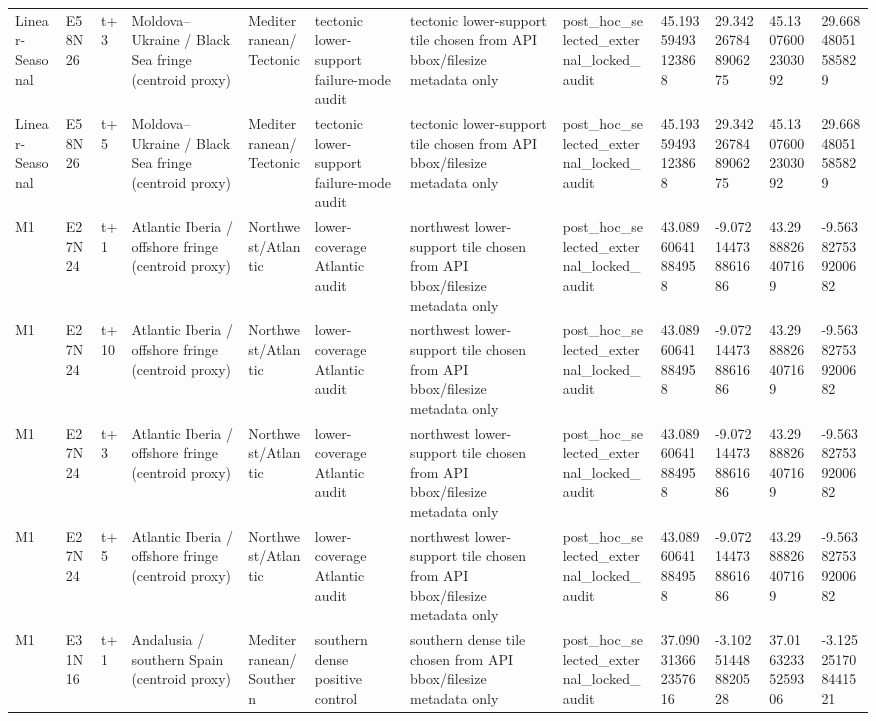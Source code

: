 \begin{landscape}
\begin{longtable}{llllllllllll}
Linear-Seasonal & E58N26 & t+3 & Moldova–Ukraine / Black Sea fringe (centroid proxy) & Mediterranean/Tectonic & tectonic lower-support failure-mode audit & tectonic lower-support tile chosen from API bbox/filesize metadata only & post\_hoc\_selected\_external\_locked\_audit & 45.19359493123868 & 29.342267848906275 & 45.13076002303092 & 29.66848051585829 \\
Linear-Seasonal & E58N26 & t+5 & Moldova–Ukraine / Black Sea fringe (centroid proxy) & Mediterranean/Tectonic & tectonic lower-support failure-mode audit & tectonic lower-support tile chosen from API bbox/filesize metadata only & post\_hoc\_selected\_external\_locked\_audit & 45.19359493123868 & 29.342267848906275 & 45.13076002303092 & 29.66848051585829 \\
M1 & E27N24 & t+1 & Atlantic Iberia / offshore fringe (centroid proxy) & Northwest/Atlantic & lower-coverage Atlantic audit & northwest lower-support tile chosen from API bbox/filesize metadata only & post\_hoc\_selected\_external\_locked\_audit & 43.08960641884958 & -9.072144738861686 & 43.2988826407169 & -9.563827539200682 \\
M1 & E27N24 & t+10 & Atlantic Iberia / offshore fringe (centroid proxy) & Northwest/Atlantic & lower-coverage Atlantic audit & northwest lower-support tile chosen from API bbox/filesize metadata only & post\_hoc\_selected\_external\_locked\_audit & 43.08960641884958 & -9.072144738861686 & 43.2988826407169 & -9.563827539200682 \\
M1 & E27N24 & t+3 & Atlantic Iberia / offshore fringe (centroid proxy) & Northwest/Atlantic & lower-coverage Atlantic audit & northwest lower-support tile chosen from API bbox/filesize metadata only & post\_hoc\_selected\_external\_locked\_audit & 43.08960641884958 & -9.072144738861686 & 43.2988826407169 & -9.563827539200682 \\
M1 & E27N24 & t+5 & Atlantic Iberia / offshore fringe (centroid proxy) & Northwest/Atlantic & lower-coverage Atlantic audit & northwest lower-support tile chosen from API bbox/filesize metadata only & post\_hoc\_selected\_external\_locked\_audit & 43.08960641884958 & -9.072144738861686 & 43.2988826407169 & -9.563827539200682 \\
M1 & E31N16 & t+1 & Andalusia / southern Spain (centroid proxy) & Mediterranean/Southern & southern dense positive control & southern dense tile chosen from API bbox/filesize metadata only & post\_hoc\_selected\_external\_locked\_audit & 37.090313662357616 & -3.102514488820528 & 37.01632335259306 & -3.125251708441521 \\

\end{longtable}
\end{landscape}
